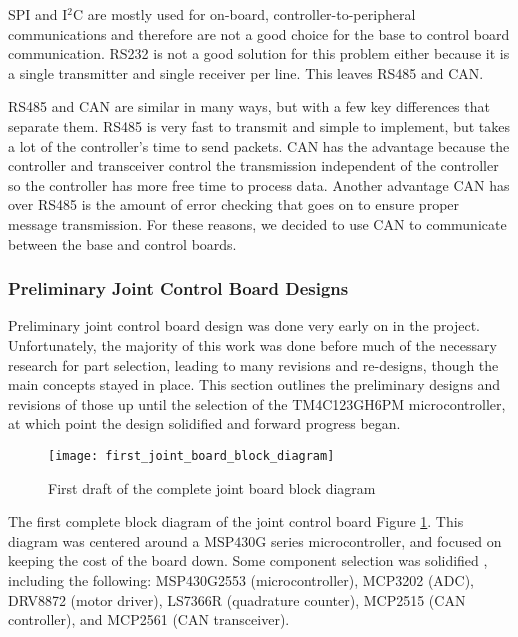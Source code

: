 \noindent SPI and I$^2$C are mostly used for on-board, controller-to-peripheral communications and therefore are not a good choice for the base to control board communication. RS232 is not a good solution for this problem either because it is a single transmitter and single receiver per line. This leaves RS485 and CAN.

\noindent RS485 and CAN are similar in many ways, but with a few key differences that separate them. RS485 is very fast to transmit and simple to implement, but takes a lot of the controller's time to send packets. CAN has the advantage because the controller and transceiver control the transmission independent of the controller so the controller has more free time to process data. Another advantage CAN has over RS485 is the amount of error checking that goes on to ensure proper message transmission. For these reasons, we decided to use CAN to communicate between the base and control boards.

\subsubsection{Preliminary Joint Control Board Designs}
\label{sec:pjcbd}
Preliminary joint control board design was done very early on in the project. Unfortunately, the majority of this work was done before much of the necessary research for part selection, leading to many revisions and re-designs, though the main concepts stayed in place. This section outlines the preliminary designs and revisions of those up until the selection of the TM4C123GH6PM microcontroller, at which point the design solidified and forward progress began. 

\begin{figure}[H]
	\centering
	\texttt{[image: first\_joint\_board\_block\_diagram]}
	\caption{First draft of the complete joint board block diagram}
	\label{fig:1st_joint_board_block}
\end{figure}

\noindent The first complete block diagram of the joint control board Figure \ref{fig:1st_joint_board_block}. This diagram was centered around a MSP430G series microcontroller, and focused on keeping the cost of the board down. Some component selection was solidified , including the following: MSP430G2553 (microcontroller), MCP3202 (ADC), DRV8872 (motor driver), LS7366R (quadrature counter), MCP2515 (CAN controller), and MCP2561 (CAN transceiver). 

